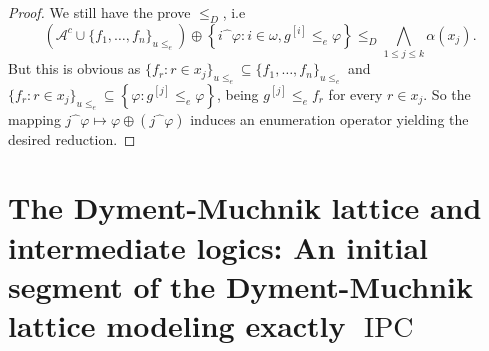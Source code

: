 \documentclass[11pt]{amsart}
\renewcommand{\phi}{\varphi}
\newcommand{\aaa}{\mathcal{A}}
\newcommand{\IPC}{\operatorname{IPC}}
\newcommand{\cat}[2]{#1\widehat{\phantom{\alpha}}\!#2}
\begin{document}
\begin{proof}
We still have the prove $\le_D$, i.e
\[ 
\left(\aaa^c \cup \{f_1, \ldots, f_n\}_{u\le_e} \right) \oplus 
\left\{\cat{i}{\phi}: i \in \omega, g^{[i]}\le_e \phi\right\} \le_D
 \bigwedge_{1 \le j \le k}\alpha(x_j).
\]
But this is obvious as $\{f_r: r \in x_j\}_{u\le_e} \subseteq \{f_1, \ldots, 
f_n\}_{u\le_e}$ and $\{f_r: r \in x_j\}_{u\le_e} \subseteq \left\{\phi: 
g^{[j]}\le_e \phi \right\}$, being $g^{[j]}\le_e f_r$ for every $r \in x_j$. 
So the mapping $\cat{j}{\phi} \mapsto \phi \oplus (\cat{j}{\phi})$ induces an 
enumeration operator yielding the desired reduction. 
\end{proof}

\section{The Dyment-Muchnik lattice and intermediate 
logics: An initial segment of the Dyment-Muchnik lattice modeling exactly 
$\IPC$}\label{sec:Dyment-Muchnik} 
\end{document}
